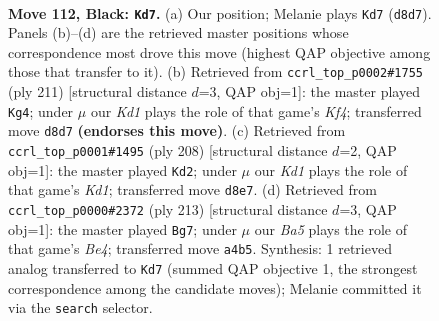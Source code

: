 \documentclass[11pt]{article}
\begin{document}
\clearpage

\begin{figure}[p]\centering
\begin{subfigure}{0.46\textwidth}\centering
\resizebox{\linewidth}{!}{%
\newchessgame
\chessboard[
  setfen={3k3K/8/8/5p2/b4P2/8/8/8 b - - 39 112},
  showmover=false,
  pgfstyle=straightmove, color=movearrow, markmove={d8-d7}
]}
\caption{}
\end{subfigure}\hfill
\begin{subfigure}{0.46\textwidth}\centering
\resizebox{\linewidth}{!}{%
\newchessgame
\chessboard[
  setfen={b7/8/8/5k1p/7P/2B5/4K3/8 b - - 14 106},
  showmover=false,
  pgfstyle=straightmove, color=movearrow, markmove={f5-g4}
]}
\caption{}
\end{subfigure}
\\[4pt]
\begin{subfigure}{0.46\textwidth}\centering
\resizebox{\linewidth}{!}{%
\newchessgame
\chessboard[
  setfen={4k3/8/8/4p3/8/5P2/B4b2/3K4 w - - 31 105},
  showmover=false,
  pgfstyle=straightmove, color=movearrow, markmove={d1-d2}
]}
\caption{}
\end{subfigure}\hfill
\begin{subfigure}{0.46\textwidth}\centering
\resizebox{\linewidth}{!}{%
\newchessgame
\chessboard[
  setfen={8/8/k7/4b3/2K5/p7/P7/6N1 b - - 71 107},
  showmover=false,
  pgfstyle=straightmove, color=movearrow, markmove={e5-g7}
]}
\caption{}
\end{subfigure}
\caption{\textbf{Move 112, Black: \texttt{Kd7}.} (a) Our position; Melanie plays \texttt{Kd7} (\texttt{d8d7}). Panels (b)--(d) are the retrieved master positions whose correspondence most drove this move (highest QAP objective among those that transfer to it). (b) Retrieved from \texttt{ccrl\_top\_p0002\#1755} (ply 211) [structural distance $d$=3, QAP obj=1]: the master played \texttt{Kg4}; under $\mu$ our \emph{Kd1} plays the role of that game's \emph{Kf4}; transferred move \texttt{d8d7} \textbf{(endorses this move)}. (c) Retrieved from \texttt{ccrl\_top\_p0001\#1495} (ply 208) [structural distance $d$=2, QAP obj=1]: the master played \texttt{Kd2}; under $\mu$ our \emph{Kd1} plays the role of that game's \emph{Kd1}; transferred move \texttt{d8e7}. (d) Retrieved from \texttt{ccrl\_top\_p0000\#2372} (ply 213) [structural distance $d$=3, QAP obj=1]: the master played \texttt{Bg7}; under $\mu$ our \emph{Ba5} plays the role of that game's \emph{Be4}; transferred move \texttt{a4b5}. Synthesis: 1 retrieved analog transferred to \texttt{Kd7} (summed QAP objective 1, the strongest correspondence among the candidate moves); Melanie committed it via the \texttt{search} selector.}
\label{fig:thought-m223}
\end{figure}
\end{document}
